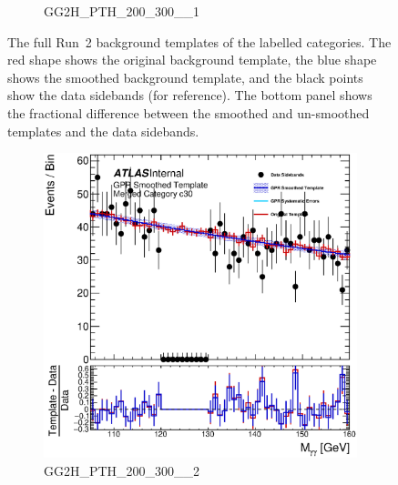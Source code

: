 \begin{figure}
\begin{center}
\begin{subfigure}[T]{0.49\linewidth}
	\caption{GG2H\_PTH\_200\_300\_\_1}
\end{subfigure}
	\caption{The full Run~2 background templates of the labelled categories. The red shape shows the original background template, the blue shape shows the smoothed background template, and the black points show the data sidebands (for reference). The bottom panel shows the fractional difference between the smoothed and un-smoothed templates and the data sidebands. }
 \label{fig:gpr_coupcat_7}
 \end{center}
\end{figure}

\begin{figure}
\begin{center}
\begin{subfigure}[T]{0.49\linewidth}
	\centering
	\includegraphics[width=\linewidth]{figures/background/gpr/coupCatTemplates/GPR_Smoothed_Plot_hmgg_c30.eps}
	\caption{GG2H\_PTH\_200\_300\_\_2}
\end{subfigure}
\begin{subfigure}[T]{0.49\linewidth}
	\centering

\end{subfigure}
\end{center}
\end{figure}
